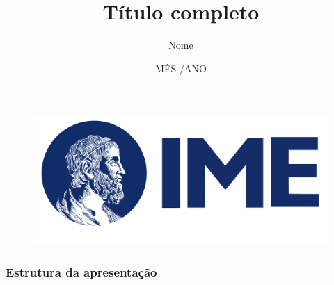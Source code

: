 \documentclass[
	11pt, %
]{beamer}
\title[Título]{Título completo}
\author{Nome}
\institute[IME-USP]{Instituto de Matemática e Estatística \\ (IME-USP)}
\date[Ano]{MÊS /ANO}
\begin{document}

\begin{frame}

        \begin{figure}
		\includegraphics[width=0.45\linewidth]{img/logo_IME.png}
	\end{figure}
 
	\titlepage %
\end{frame}



\begin{frame}
	\frametitle{Estrutura da apresentação} %
	
	\tableofcontents %
\end{frame}

\end{document}
